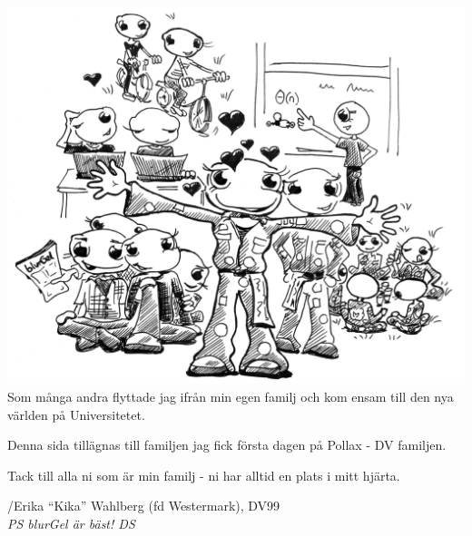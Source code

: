 \documentclass[a6paper,fontsize=10pt,twoside,open=right]{scrbook}
\begin{document}

\vspace{15pt}

\vspace{15pt}

\newpage

\newpage

\newpage
\null
\vspace{5pt}
\includegraphics[keepaspectratio,width=\textwidth]{elements/kika.jpg}
\vspace{10pt}\\ Som många andra flyttade jag ifrån min egen familj och
kom ensam till den nya världen på Universitetet.\par
\vspace{10pt}
Denna sida tillägnas till familjen jag fick första dagen på Pollax -
DV familjen.\par
\vspace{10pt}
Tack till alla ni som är min familj - ni har alltid en plats i mitt
hjärta.\par
\vspace{10pt}
/Erika ``Kika'' Wahlberg (fd Westermark),
DV99\\{\footnotesize\textit{PS blurGel är bäst! DS}}
\newpage

\vspace{15pt}

\newpage

\newpage

\newpage

\vspace{15pt}

\newpage

\end{document}
